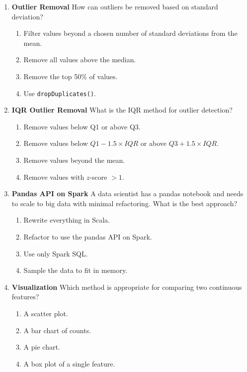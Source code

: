 \documentclass{article}
\begin{document}
\begin{enumerate}[label=\textbf{Q\arabic*.}]
		\item \textbf{Outlier Removal}
		How can outliers be removed based on standard deviation?
		\begin{enumerate}[label=\Alph*.]
			\item Filter values beyond a chosen number of standard deviations from the mean.
			\item Remove all values above the median.
			\item Remove the top 50\% of values.
			\item Use \texttt{dropDuplicates()}.
		\end{enumerate}
		
		\item \textbf{IQR Outlier Removal}
		What is the IQR method for outlier detection?
		\begin{enumerate}[label=\Alph*.]
			\item Remove values below Q1 or above Q3.
			\item Remove values below $Q1 - 1.5 \times IQR$ or above $Q3 + 1.5 \times IQR$.
			\item Remove values beyond the mean.
			\item Remove values with $z$-score $> 1$.
		\end{enumerate}
		
		\item \textbf{Pandas API on Spark}
		A data scientist has a pandas notebook and needs to scale to big data with minimal refactoring. What is the best approach?
		\begin{enumerate}[label=\Alph*.]
			\item Rewrite everything in Scala.
			\item Refactor to use the pandas API on Spark.
			\item Use only Spark SQL.
			\item Sample the data to fit in memory.
		\end{enumerate}
		
		\item \textbf{Visualization}
		Which method is appropriate for comparing two continuous features?
		\begin{enumerate}[label=\Alph*.]
			\item A scatter plot.
			\item A bar chart of counts.
			\item A pie chart.
			\item A box plot of a single feature.
		\end{enumerate}
		

\end{enumerate}
\end{document}

